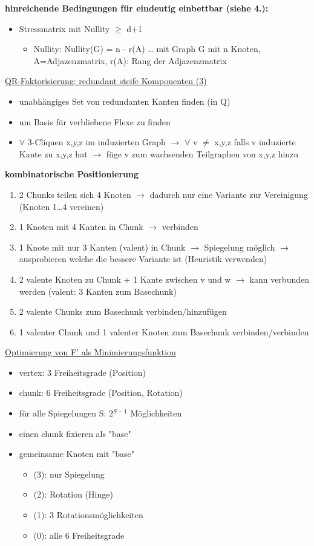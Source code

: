 \documentclass[12pt,a4paper]{article}
\begin{document}
\textbf{hinreichende Bedingungen für eindeutig einbettbar (siehe 4.):}
\begin{itemize}
	\item Stressmatrix mit Nullity $\geq$ d+1
	\begin{itemize}
		\item Nullity: Nullity(G) = n - r(A) … mit Graph G mit n Knoten, A=Adjazenzmatrix, r(A): Rang der Adjazenzmatrix
	\end{itemize}
\end{itemize}

\parbox{\linewidth}{
\underline{QR-Faktorisierung: redundant steife Komponenten (3)}\\
\begin{itemize}
	\item unabhängiges Set von redundanten Kanten finden (in Q)
	\item um Basis für verbliebene Flexe zu finden
	\item $\forall$ 3-Cliquen x,y,z im induzierten Graph $\rightarrow$ $\forall$ v $\neq$ x,y,z falls v induzierte Kante zu x,y,z hat $\rightarrow$ füge v zum wachsenden Teilgraphen von x,y,z hinzu
\end{itemize}
}

\parbox{\linewidth}{
\textbf{kombinatorische Positionierung}
\begin{enumerate}
	\item 2 Chunks teilen sich 4 Knoten $\rightarrow$ dadurch nur eine Variante zur Vereinigung (Knoten 1…4 vereinen)
	\item 1 Knoten mit 4 Kanten in Chunk $\rightarrow$ verbinden
	\item 1 Knote mit nur 3 Kanten (valent) in Chunk $\rightarrow$ Spiegelung möglich $\rightarrow$ ausprobieren welche die bessere Variante ist (Heuristik verwenden)
	\item 2 valente Knoten zu Chunk + 1 Kante zwischen v und w $\rightarrow$ kann verbunden werden (valent: 3 Kanten zum Basechunk)
	\item 2 valente Chunks zum Basechunk verbinden/hinzufügen
	\item 1 valenter Chunk und 1 valenter Knoten zum Basechunk verbinden/verbinden
\end{enumerate}
}

\underline{Optimierung von F' als Minimierungsfunktion}
\begin{itemize}
	\item vertex: 3 Freiheitsgrade (Position)
	\item chunk: 6 Freiheitsgrade (Position, Rotation)
	\item für alle Spiegelungen S: 2$^{S-1}$ Möglichkeiten
	\item einen chunk fixieren als "base"
	\item gemeinsame Knoten mit "base"
	\begin{itemize}
		\item (3): nur Spiegelung
		\item (2): Rotation (Hinge)
		\item (1): 3 Rotationsmöglichkeiten
		\item (0): alle 6 Freiheitsgrade
	\end{itemize}
\end{itemize}
\end{document}
